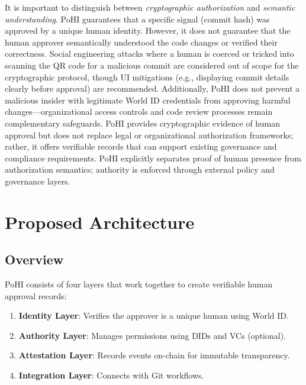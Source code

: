 \documentclass[conference]{IEEEtran}
\begin{document}
It is important to distinguish between \textit{cryptographic authorization} and \textit{semantic understanding}.
PoHI guarantees that a specific signal (commit hash) was approved by a unique human identity.
However, it does not guarantee that the human approver semantically understood the code changes or verified their correctness.
Social engineering attacks where a human is coerced or tricked into scanning the QR code for a malicious commit are considered out of scope for the cryptographic protocol, though UI mitigations (e.g., displaying commit details clearly before approval) are recommended.
Additionally, PoHI does not prevent a malicious insider with legitimate World ID credentials from approving harmful changes---organizational access controls and code review processes remain complementary safeguards.
PoHI provides cryptographic evidence of human approval but does not replace legal or organizational authorization frameworks; rather, it offers verifiable records that can support existing governance and compliance requirements.
PoHI explicitly separates proof of human presence from authorization semantics; authority is enforced through external policy and governance layers.

\section{Proposed Architecture}

\subsection{Overview}

PoHI consists of four layers that work together to create verifiable human approval records:

\begin{enumerate}
    \item \textbf{Identity Layer}: Verifies the approver is a unique human using World ID.
    \item \textbf{Authority Layer}: Manages permissions using DIDs and VCs (optional).
    \item \textbf{Attestation Layer}: Records events on-chain for immutable transparency.
    \item \textbf{Integration Layer}: Connects with Git workflows.
\end{enumerate}
\end{document}
